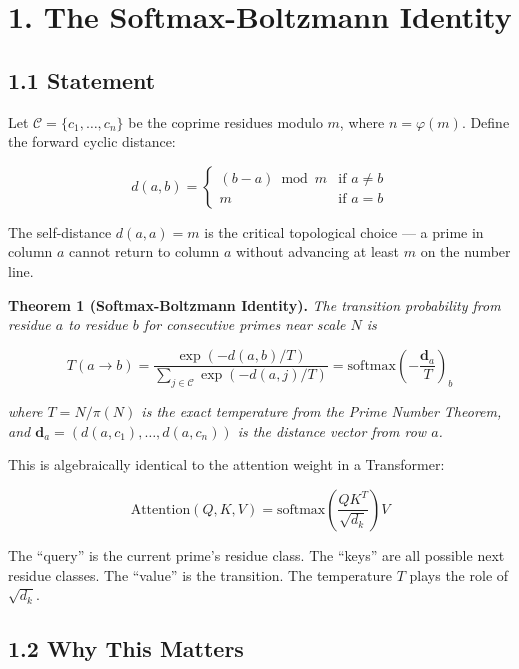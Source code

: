 \documentclass[
  11pt,
]{article}
\numberwithin{equation}{section}
\begin{document}
\section{1. The Softmax-Boltzmann
Identity}\label{the-softmax-boltzmann-identity}

\subsection{1.1 Statement}\label{statement}

Let \(\mathcal{C} = \{c_1, \ldots, c_n\}\) be the coprime residues
modulo \(m\), where \(n = \varphi(m)\). Define the forward cyclic
distance:

\begin{equation}d(a, b) = \begin{cases} (b - a) \bmod m & \text{if } a \neq b \\ m & \text{if } a = b \end{cases}\end{equation}

The self-distance \(d(a,a) = m\) is the critical topological choice ---
a prime in column \(a\) cannot return to column \(a\) without advancing
at least \(m\) on the number line.

\textbf{Theorem 1 (Softmax-Boltzmann Identity).} \emph{The transition
probability from residue \(a\) to residue \(b\) for consecutive primes
near scale \(N\) is}

\begin{equation}\boxed{T(a \to b) = \frac{\exp(-d(a,b)/T)}{\sum_{j \in \mathcal{C}} \exp(-d(a,j)/T)} = \text{softmax}\left(-\frac{\mathbf{d}_a}{T}\right)_b}\end{equation}

\emph{where \(T = N/\pi(N)\) is the exact temperature from the Prime
Number Theorem, and \(\mathbf{d}_a = (d(a, c_1), \ldots, d(a, c_n))\) is
the distance vector from row \(a\).}

This is algebraically identical to the attention weight in a
Transformer:

\begin{equation}\text{Attention}(Q, K, V) = \text{softmax}\left(\frac{QK^T}{\sqrt{d_k}}\right) V\end{equation}

The ``query'' is the current prime's residue class. The ``keys'' are all
possible next residue classes. The ``value'' is the transition. The
temperature \(T\) plays the role of \(\sqrt{d_k}\).

\subsection{1.2 Why This Matters}\label{why-this-matters}
\end{document}
